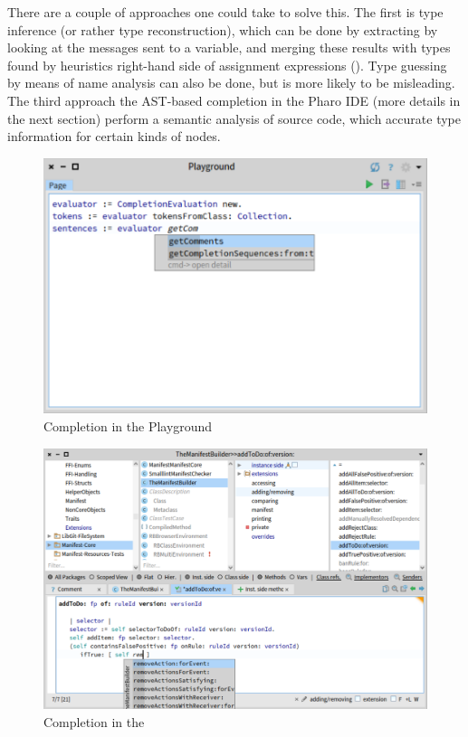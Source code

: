 There are a couple of approaches one could take to solve this. The first is type inference (or rather type reconstruction), which can be done by extracting  by looking at the messages sent to a variable, and merging these results with types found by heuristics  right-hand side of assignment expressions (\cite{Pluq09a}). Type guessing by means of name analysis can also be done, but  is more likely to be misleading. The third approach the AST-based completion in the Pharo IDE (more details in the next section) perform a semantic analysis of source code, which  accurate type information for certain kinds of nodes.

\begin{figure}[H]
    \centering
    \includegraphics[width=0.9\linewidth]{images/completion1.png}
    \caption{Completion in the Playground}
    \label{fig:playground}
\end{figure}

\begin{figure}[H]
    \centering
    \includegraphics[width=0.9\linewidth]{images/completion2.png}
    \caption{Completion in the }
    \label{fig:editor}
\end{figure}

